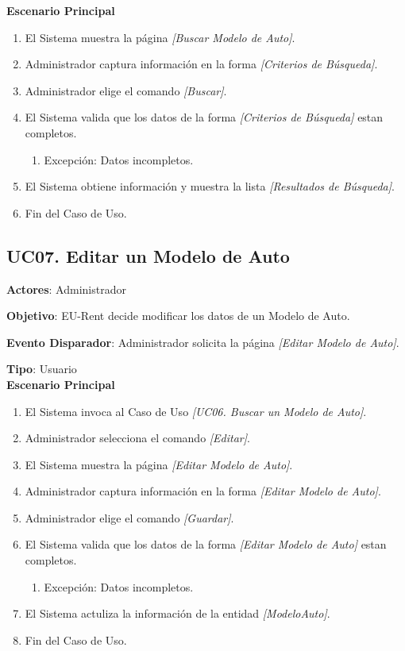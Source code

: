 \textbf{Escenario Principal}

\begin{enumerate}
\item El Sistema muestra la página \textit{[Buscar Modelo de Auto]}.
\item Administrador captura información en la forma \textit{[Criterios de Búsqueda]}.
\item Administrador elige el comando \textit{[Buscar]}.
\item El Sistema valida que los datos de la forma \textit{[Criterios de Búsqueda]} estan completos.
	\begin{enumerate}
		\item Excepción: Datos incompletos.
	\end{enumerate}
\item El Sistema obtiene información y muestra la lista \textit{[Resultados de Búsqueda]}.
\item Fin del Caso de Uso.
\end{enumerate}
\subsection{UC07. Editar un Modelo de Auto} \label{EditarModeloAuto}
\textbf{Actores}: Administrador

\textbf{Objetivo}: EU-Rent decide modificar los datos de un Modelo de Auto.

\textbf{Evento Disparador}: Administrador solicita la página \textit{[Editar Modelo de Auto]}.

\textbf{Tipo}: Usuario\\

\textbf{Escenario Principal}

\begin{enumerate}
\item El Sistema invoca al Caso de Uso \textit{[UC06. Buscar un Modelo de Auto]}.
\item Administrador selecciona el comando \textit{[Editar]}.
\item El Sistema muestra la página \textit{[Editar Modelo de Auto]}.
\item Administrador captura información en la forma \textit{[Editar Modelo de Auto]}.
\item Administrador elige el comando \textit{[Guardar]}.
\item El Sistema valida que los datos de la forma \textit{[Editar Modelo de Auto]} estan completos.
	\begin{enumerate}
		\item Excepción: Datos incompletos.
	\end{enumerate}
\item El Sistema actuliza la información de la entidad \textit{[ModeloAuto]}.
\item Fin del Caso de Uso.
\end{enumerate}
